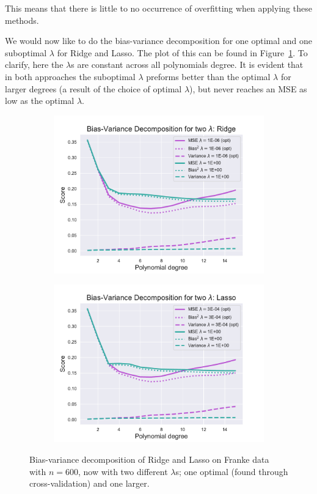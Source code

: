\documentclass[twocolumn,english,notitlepage]{article}
\begin{document}
            This means that there is little to no occurrence of overfitting when applying these methods.     

            We would now like to do the bias-variance decomposition for one optimal and one suboptimal $\lambda$ for Ridge and Lasso. The plot of this can be found in Figure~\ref{res:fig:bs_bias_var_two_lmbdas_Ridge_Lasso}. To clarify, here the $\lambda$s are constant across all polynomials degree. It is evident that in both approaches the suboptimal $\lambda$ preforms better than the optimal $\lambda$ for larger degrees (a result of the choice of optimal $\lambda$), but never reaches an MSE as low as the optimal $\lambda$. 

            \begin{figure}[ht]
                \begin{subfigure}{\linewidth}
                    \centering
                    \includegraphics[width=.9\linewidth]{BS_bias_var_two_lmbdas_Ridge.pdf}
                \end{subfigure}
                \begin{subfigure}{\linewidth}
                    \centering
                    \includegraphics[width=.9\linewidth]{BS_bias_var_two_lmbdas_Lasso.pdf}
                \end{subfigure}
                \caption{Bias-variance decomposition of Ridge and Lasso on Franke data with $n=600$, now with two different $\lambda$s; one optimal (found through cross-validation) and one larger.}
                \label{res:fig:bs_bias_var_two_lmbdas_Ridge_Lasso}
            \end{figure}
\end{document}
